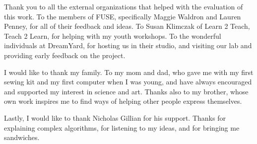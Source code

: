 Thank you to all the external organizations that helped with the evaluation of this work. To the members of FUSE, specifically Maggie Waldron and Lauren Penney, for all of their feedback and ideas. To Susan Klimczak of Learn 2 Teach, Teach 2 Learn, for helping with my youth workshops. To the wonderful individuals at DreamYard, for hosting us in their studio, and visiting our lab and providing early feedback on the project. 

I would like to thank my family. To my mom and dad, who gave me with my first sewing kit and my first computer when I was young, and have always encouraged and supported my interest in science and art. Thanks also to my brother, whose own work inspires me to find ways of helping other people express themselves. 

Lastly, I would like to thank Nicholas Gillian for his support. Thanks for explaining complex algorithms, for listening to my ideas, and for bringing me sandwiches.

